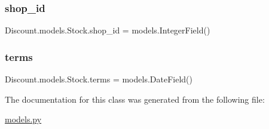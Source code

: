 \subsubsection{\texorpdfstring{shop\+\_\+id}{shop\_id}}
{\footnotesize\ttfamily Discount.\+models.\+Stock.\+shop\+\_\+id = models.\+Integer\+Field()\hspace{0.3cm}{\ttfamily [static]}}

\mbox{\label{class_discount_1_1models_1_1_stock_a16676c9e0f2273d5df3290d38d84cfe8}} 
\subsubsection{\texorpdfstring{terms}{terms}}
{\footnotesize\ttfamily Discount.\+models.\+Stock.\+terms = models.\+Date\+Field()\hspace{0.3cm}{\ttfamily [static]}}



The documentation for this class was generated from the following file\+:\begin{DoxyCompactItemize}
\item 
\hyperlink{models_8py}{models.\+py}\end{DoxyCompactItemize}
